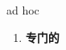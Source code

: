 
\begin{frame}
{\huge ad hoc}
\begin{center}
\begin{enumerate}\Large
  \item \textbf{专门的}
\end{enumerate}
\end{center}
\end{frame}
